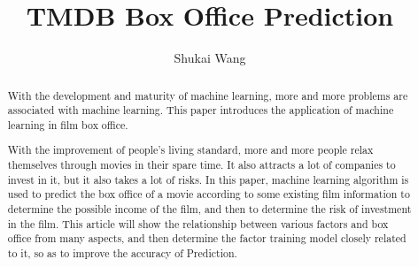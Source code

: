 \documentclass{amsart}
\begin{document}
%
%
\title[TMDB Box Office Prediction]{TMDB Box Office Prediction}%

\author{Shukai Wang}
\address[A.~1]{School of Computer Science,\\ 
Xi'an Shiyou University, Shaanxi 710065, China}%




%
%
\date{\gitAuthorDate}%

\begin{abstract}
  With the development and maturity of machine learning, 
  more and more problems are associated with machine learning. 
  This paper introduces the application of machine learning in film box office.

 With the improvement of people's living standard,
 more and more people relax themselves through movies in their spare time. 
 It also attracts a lot of companies to invest in it, but it also takes a lot of risks. 
 In this paper, machine learning algorithm is used to predict 
 the box office of a movie according to some existing film information to determine 
 the possible income of the film, and then to determine the risk of investment in the film. 
 This article will show the relationship between various factors and box office from many aspects,
  and then determine the factor training model closely related to it, so as to improve the accuracy of Prediction.
\end{abstract}

\maketitle
\tableofcontents

\newpage



\newpage



\end{document}
